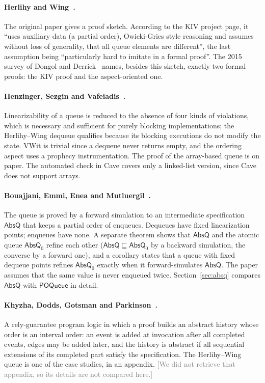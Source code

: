 \documentclass[11pt]{article}
\newcommand{\POQueue}{\mathsf{POQueue}}
\newcommand{\AbsQ}{\mathsf{AbsQ}}
\newcommand{\AbsQz}{\mathsf{AbsQ}_0}
\newcommand{\unverified}[1]{\textcolor{gray}{[#1]}}
\begin{document}
\paragraph{Herlihy and Wing~\cite{HW90}.}
The original paper gives a proof sketch.  According to the KIV project page,
it ``uses auxiliary data (a partial order), Owicki-Gries style reasoning and
assumes without loss of generality, that all queue elements are different'',
the last assumption being ``particularly hard to imitate in a formal
proof''.  The 2015 survey of Dongol and Derrick~\cite{DD15} names, besides
this sketch, exactly two formal proofs: the KIV proof and the aspect-oriented
one.

\paragraph{Henzinger, Sezgin and Vafeiadis~\cite{HSV13,CHSV15}.}
Linearizability of a queue is reduced to the absence of four kinds of
violations, which is necessary and sufficient for purely blocking
implementations; the Herlihy--Wing dequeue qualifies because its blocking
executions do not modify the state.  VWit is trivial since a dequeue never
returns empty, and the ordering aspect uses a prophecy instrumentation.  The
proof of the array-based queue is on paper.  The automated check in Cave
covers only a linked-list version, since Cave does not support arrays.

\paragraph{Bouajjani, Emmi, Enea and Mutluergil~\cite{BEEM17}.}
The queue is proved by a forward simulation to an intermediate
specification $\AbsQ$ that keeps a partial order of enqueues.  Dequeues have
fixed linearization points; enqueues have none.  A separate theorem shows
that $\AbsQ$ and the atomic queue $\AbsQz$ refine each other ($\AbsQ
\sqsubseteq \AbsQz$ by a backward simulation, the converse by a forward
one), and a corollary states that a queue with fixed dequeue points refines
$\AbsQz$ exactly when it forward-simulates $\AbsQ$.  The paper assumes that
the same value is never enqueued twice.  Section~\ref{sec:absq} compares
$\AbsQ$ with $\POQueue$ in detail.

\paragraph{Khyzha, Dodds, Gotsman and Parkinson~\cite{KDGP17}.}
A rely-guarantee program logic in which a proof builds an abstract history
whose order is an interval order: an event is added at invocation after all
completed events, edges may be added later, and the history is abstract if
all sequential extensions of its completed part satisfy the specification.
The Herlihy--Wing queue is one of the case studies, in an appendix.
\unverified{We did not retrieve that appendix, so its details are not
compared here.}
\end{document}

